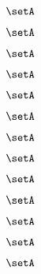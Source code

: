 \begin{forslides}
\begin{forslides}
    \begin{equation}
        \label{eq:slides-translation-47}
        \setA
    \end{equation}

    \begin{equation}
        \label{eq:slides-translation-48}
        \setA
    \end{equation}

    \begin{equation}
        \label{eq:slides-translation-49}
        \setA
    \end{equation}

    \begin{equation}
        \label{eq:slides-translation-50}
        \setA
    \end{equation}

    \begin{equation}
        \label{eq:slides-translation-51}
        \setA
    \end{equation}

    \begin{equation}
        \label{eq:slides-translation-52}
        \setA
    \end{equation}

    \begin{equation}
        \label{eq:slides-translation-53}
        \setA
    \end{equation}

    \begin{equation}
        \label{eq:slides-translation-54}
        \setA
    \end{equation}

    \begin{equation}
        \label{eq:slides-translation-55}
        \setA
    \end{equation}

    \begin{equation}
        \label{eq:slides-translation-56}
        \setA
    \end{equation}

    \begin{equation}
        \label{eq:slides-translation-57}
        \setA
    \end{equation}

    \begin{equation}
        \label{eq:slides-translation-58}
        \setA
    \end{equation}

    \begin{equation}
        \label{eq:slides-translation-59}
        \setA
    \end{equation}


\end{forslides}
\end{forslides}
